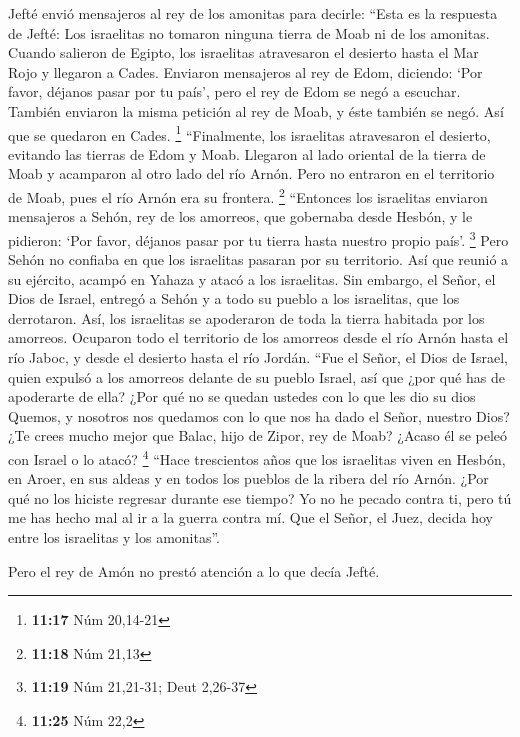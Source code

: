  Jefté envió mensajeros al rey de los amonitas
 para decirle: ``Esta es la respuesta de Jefté: Los
israelitas no tomaron ninguna tierra de Moab ni de los amonitas.
 Cuando salieron de Egipto, los israelitas atravesaron el
desierto hasta el Mar Rojo y llegaron a Cades.  Enviaron
mensajeros al rey de Edom, diciendo: `Por favor, déjanos pasar por tu
país', pero el rey de Edom se negó a escuchar. También enviaron la misma
petición al rey de Moab, y éste también se negó. Así que se quedaron en
Cades. \footnote{\textbf{11:17} Núm 20,14-21} 
``Finalmente, los israelitas atravesaron el desierto, evitando las
tierras de Edom y Moab. Llegaron al lado oriental de la tierra de Moab y
acamparon al otro lado del río Arnón. Pero no entraron en el territorio
de Moab, pues el río Arnón era su frontera. \footnote{\textbf{11:18} Núm
  21,13}  ``Entonces los israelitas enviaron mensajeros a
Sehón, rey de los amorreos, que gobernaba desde Hesbón, y le pidieron:
`Por favor, déjanos pasar por tu tierra hasta nuestro propio país'.
\footnote{\textbf{11:19} Núm 21,21-31; Deut 2,26-37} 
Pero Sehón no confiaba en que los israelitas pasaran por su territorio.
Así que reunió a su ejército, acampó en Yahaza y atacó a los israelitas.
 Sin embargo, el Señor, el Dios de Israel, entregó a
Sehón y a todo su pueblo a los israelitas, que los derrotaron. Así, los
israelitas se apoderaron de toda la tierra habitada por los amorreos.
 Ocuparon todo el territorio de los amorreos desde el río
Arnón hasta el río Jaboc, y desde el desierto hasta el río Jordán.
 ``Fue el Señor, el Dios de Israel, quien expulsó a los
amorreos delante de su pueblo Israel, así que ¿por qué has de apoderarte
de ella?  ¿Por qué no se quedan ustedes con lo que les
dio su dios Quemos, y nosotros nos quedamos con lo que nos ha dado el
Señor, nuestro Dios?  ¿Te crees mucho mejor que Balac,
hijo de Zipor, rey de Moab? ¿Acaso él se peleó con Israel o lo atacó?
\footnote{\textbf{11:25} Núm 22,2}  ``Hace trescientos
años que los israelitas viven en Hesbón, en Aroer, en sus aldeas y en
todos los pueblos de la ribera del río Arnón. ¿Por qué no los hiciste
regresar durante ese tiempo?  Yo no he pecado contra ti,
pero tú me has hecho mal al ir a la guerra contra mí. Que el Señor, el
Juez, decida hoy entre los israelitas y los amonitas''.

 Pero el rey de Amón no prestó atención a lo que decía
Jefté.

